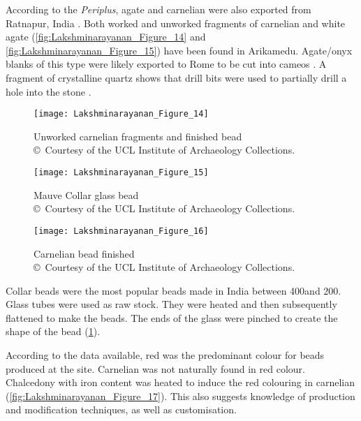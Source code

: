 According to the \emph{Periplus}, agate and carnelian were also exported from Ratnapur, India \parencite[][127]{chandra1977}. Both worked and unworked fragments of carnelian and white agate (\cref{fig:Lakshminarayanan_Figure_14} and \cref{fig:Lakshminarayanan_Figure_15}) have been found in Arikamedu. Agate/onyx blanks of this type were likely exported to Rome to be cut into cameos \parencite[][181]{sidebotham2008}. A fragment of crystalline quartz shows that drill bits were used to partially drill a hole into the stone \parencite[][]{gwinett1988}.

\begin{figure}[!htb]
	\texttt{[image: Lakshminarayanan\_Figure\_14]}
	\caption{Unworked carnelian fragments and finished bead\\
		{\normalfont\scriptsize\copyright\ Courtesy of the UCL Institute of Archaeology Collections.
	}}
	\label{fig:Lakshminarayanan_Figure_14}
%
\hfill
	\texttt{[image: Lakshminarayanan\_Figure\_15]}
	\caption{Mauve Collar glass bead\\
		{\normalfont\scriptsize\copyright\ Courtesy of the UCL Institute of Archaeology Collections.
	}}
	\label{fig:Lakshminarayanan_Figure_15}
\hfill
	\texttt{[image: Lakshminarayanan\_Figure\_16]}
	\caption{Carnelian bead finished\\
		{\normalfont\scriptsize\copyright\ Courtesy of the UCL Institute of Archaeology Collections.
	}}
	\label{fig:Lakshminarayanan_Figure_16}
\end{figure}

Collar beads were the most popular beads made in India between 400\BC and 200\AD \parencite[][117]{francis1986}. Glass tubes were used as raw stock. They were heated and then subsequently flattened to make the beads. The ends of the glass were pinched to create the shape of the bead (\cref{fig:Lakshminarayanan_Figure_16}).

According to the data available, red was the predominant colour for beads produced at the site. Carnelian was not naturally found in red colour. Chalcedony with iron content was heated to induce the red colouring in carnelian (\cref{fig:Lakshminarayanan_Figure_17}). This also suggests knowledge of production and modification techniques, as well as customisation.

